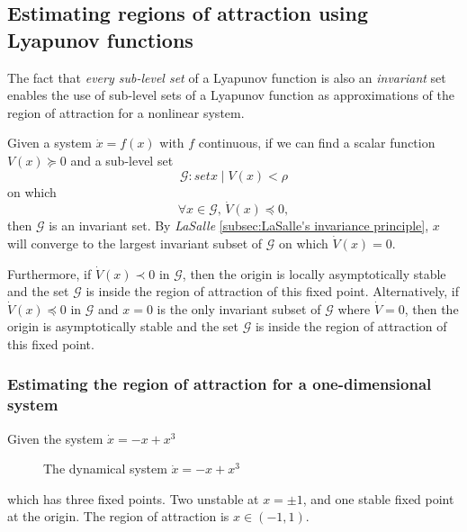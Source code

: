 \subsection{Estimating regions of attraction using Lyapunov functions}

The fact that \textit{every sub-level set} of a Lyapunov function is also an
\textit{invariant} set enables the use of sub-level sets of a Lyapunov function
as approximations of the region of attraction for a nonlinear system.

\begin{theorem}
  Given a system \(\dot{x} = f(x)\) with \(f\) continuous, if we can find a
  scalar function \(V(x) \succeq 0 \) and a sub-level set
  \[
    \mathcal{G} \colon set{x \mid V(x) < \rho}
  \]
  on which
  \[
    \forall x \in \mathcal{G},\,\dot{V}(x) \preceq 0,
  \]
  then \(\mathcal{G}\) is an invariant set. By \textit{LaSalle}
  \ref{subsec:LaSalle's invariance principle}, \(x\) will converge to the
  largest invariant subset of \(\mathcal{G}\) on which \(\dot{V}(x) = 0\).

  Furthermore, if \(\dot{V}(x) \prec 0\) in \(\mathcal{G}\), then the origin is
  locally asymptotically stable and the set \(\mathcal{G}\) is inside the region
  of attraction of this fixed point. Alternatively, if \(\dot{V}(x) \preceq 0 \)
  in \(\mathcal{G}\) and \(x = 0\) is the only invariant subset of
  \(\mathcal{G}\) where \(\dot{V} = 0\), then the origin is asymptotically
  stable and the set \(\mathcal{G}\) is inside the region of attraction of this
  fixed point.
\end{theorem}
\cite{tedrakeUnderactuatedRoboticsAlgorithms2019}

\subsubsection{Estimating the region of attraction for a one-dimensional system}
\label{subsec:Estimating the region of attraction for a one-dimensional system}

Given the system \(\dot{x} = -x + x^3\)
\begin{figure}
  
  \caption{The dynamical system \(\dot{x} = -x + x^3\)}
\end{figure}
which has three fixed points. Two unstable at \(x = \pm 1\), and one stable
fixed point at the origin. The region of attraction is \(x \in \left( -1, 1
\right)\).

